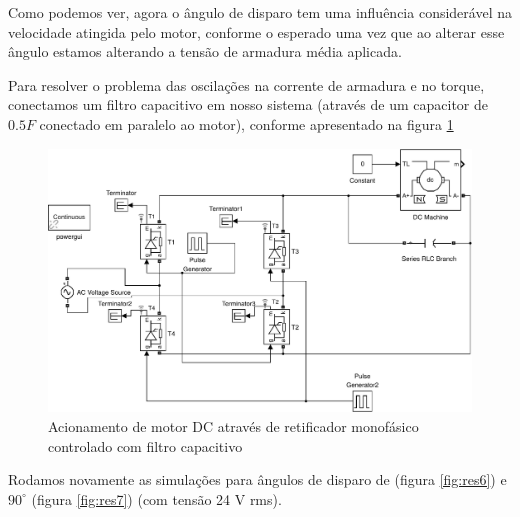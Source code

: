 \documentclass{article}
\begin{document}
Como podemos ver, agora o ângulo de disparo tem uma influência considerável na velocidade atingida pelo motor, conforme o esperado uma vez que ao alterar esse ângulo estamos alterando a tensão de armadura média aplicada.

Para resolver o problema das oscilações na corrente de armadura e no torque, conectamos um filtro capacitivo em nosso sistema (através de um capacitor de $0.5 F$ conectado em paralelo ao motor), conforme apresentado na figura \ref{fig:sim4} 

\begin{figure}[H]
	\centering
	\includegraphics[width=\linewidth]{matlab/sim4}
	\caption{Acionamento de motor DC através de retificador monofásico controlado com filtro capacitivo}
	\label{fig:sim4}
\end{figure}

Rodamos novamente as simulações para ângulos de disparo de (figura \ref{fig:res6}) e $90^\circ$ (figura \ref{fig:res7}) (com tensão 24 V rms).
\end{document}
